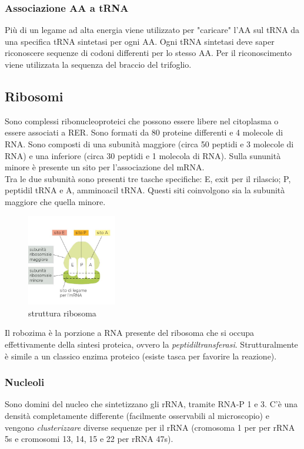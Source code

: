         \subsubsection{Associazione AA a tRNA}
            Più di un legame ad alta energia viene utilizzato per "caricare" l'AA sul tRNA da una specifica tRNA sintetasi per ogni AA. 
            Ogni tRNA sintetasi deve saper riconoscere sequenze di codoni differenti per lo stesso AA. Per il riconoscimento viene utilizzata la sequenza del braccio del trifoglio. 
         
    \subsection{Ribosomi}
        Sono complessi ribonucleoproteici che possono essere libere nel citoplasma o essere associati a RER. Sono formati da 80 proteine differenti e 4 molecole di RNA. Sono composti di una subunità maggiore (circa 50 peptidi e 3 molecole di RNA) e una inferiore (circa 30 peptidi e 1 molecola di RNA). Sulla sununità minore è presente un sito per l'associazione del mRNA.\\
        Tra le due subunità sono presenti tre tasche specifiche: E, exit per il rilascio; P, peptidil tRNA e A, amminoacil tRNA. Questi siti coinvolgono sia la subunità maggiore che quella minore. 
        \begin{figure}[h]
                \centering
                \includegraphics[width=0.35\textwidth]{images/ribosoma.JPG}
                \caption{\small struttura ribosoma}
                \label{fig:mesh1}
        \end{figure}
        Il robozima è la porzione a RNA presente del ribosoma che si occupa effettivamente della sintesi proteica, ovvero la \textit{peptidiltransferasi}. Strutturalmente è simile a un classico enzima proteico (esiste tasca per favorire la reazione).
        \subsubsection{Nucleoli}
            Sono domini del nucleo che sintetizzano gli rRNA, tramite RNA-P 1 e 3. C'è una densità completamente differente (facilmente osservabili al microscopio) e vengono \textit{clusterizzare} diverse sequenze per il rRNA (cromosoma 1 per per rRNA 5s e cromosomi 13, 14, 15 e 22 per rRNA 47s).
    
